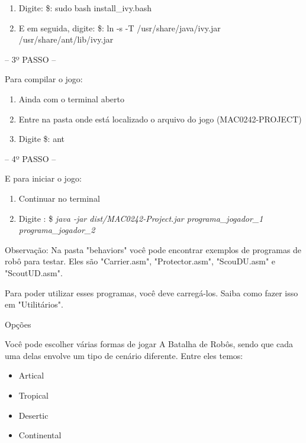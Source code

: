 \documentclass[a4paper]{article}
\begin{document}
{{{\begin{enumerate}
	\item Digite: \$: sudo bash install\_ivy.bash

	\item E em seguida, digite: \$: ln -s -T /usr/share/java/ivy.jar /usr/share/ant/lib/ivy.jar

\end{enumerate}

\bigskip


\textcolor{NavyBlue}{-- 3º PASSO --}

Para compilar o jogo:

\begin{enumerate}
	\item Ainda com o terminal aberto

	\item Entre na pasta onde está localizado o arquivo do jogo (MAC0242-PROJECT)

	\item Digite \$: ant
\end{enumerate}

\bigskip



\textcolor{NavyBlue}{-- 4º PASSO --}

E para iniciar o jogo: 

\begin{enumerate}                                            
	\item Continuar no terminal
 	\item Digite : \$ \textit{ java -jar dist/MAC0242-Project.jar programa\_jogador\_1 programa\_jogador\_2} 
\end{enumerate}

Observação: Na pasta "behaviors" você pode encontrar exemplos de 
programas de robô para testar.
Eles são "Carrier.asm", "Protector.asm", "ScouDU.asm" e "ScoutUD.asm".

Para poder utilizar esses programas, você deve carregá-los. Saiba 
como fazer isso em "Utilitários".

\bigskip


\newpage %

{\textcolor{NavyBlue}{\LARGE Opções}

Você pode escolher várias formas de jogar A Batalha de Robôs,
sendo que cada uma delas envolve um tipo de cenário diferente.
Entre eles temos:

\begin{itemize}
	\item Artical
	\item Tropical
	\item Desertic
	\item Continental
\end{itemize}

}}}}
\end{document}

